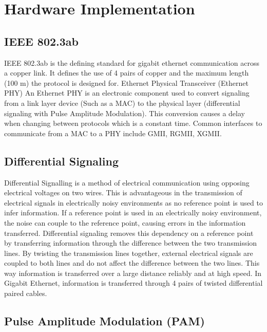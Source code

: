 \section{Hardware Implementation}

\subsection{IEEE 802.3ab}

\par IEEE 802.3ab is the defining standard for gigabit ethernet communication across a copper link. 
It defines the use of 4 pairs of copper and the maximum length (100 m) the protocol is designed for.
Ethernet Physical Transceiver (Ethernet PHY)
An Ethernet PHY is an electronic component used to convert signaling from a link layer device (Such as a MAC) 
to the physical layer (differential signaling with Pulse Amplitude Modulation). This conversion causes a delay when 
changing between protocols which is a constant time. Common interfaces to communicate from a MAC to a PHY include 
GMII, RGMII, XGMII.

\subsection{Differential Signaling}

\par Differential Signalling is a method of electrical communication using opposing electrical voltages on two wires. 
This is advantageous in the transmission of electrical signals in electrically noisy environments as no reference 
point is used to infer information. If a reference point is used in an electrically noisy environment, the 
noise can couple to the reference point, causing errors in the information transferred. Differential signaling 
removes this dependency on a reference point by transferring information through the difference between the two 
transmission lines. By twisting the transmission lines together, external electrical signals are coupled to both 
lines and do not affect the difference between the two lines. This way information is transferred over a large 
distance reliably and at high speed. In Gigabit Ethernet, information is transferred through 4 pairs of twisted 
differential paired cables.

\subsection{Pulse Amplitude Modulation (PAM)}


